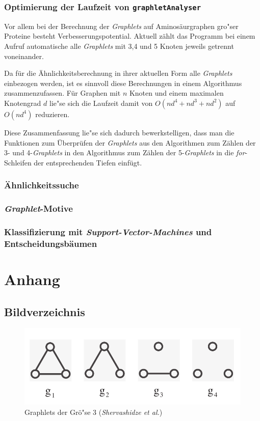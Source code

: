\documentclass{report}
\begin{document}
\subsection{Optimierung der Laufzeit von \texttt{graphletAnalyser}}

Vor allem bei der Berechnung der \textit{Graphlets} auf Aminos\"aurgraphen gro"ser Proteine besteht Verbesserungspotential. Aktuell z\"ahlt das Programm bei einem Aufruf automatische alle \textit{Graphlets} mit 3,4 und 5 Knoten jeweils getrennt voneinander.

Da f\"ur die \"Ahnlichkeitsberechnung in ihrer aktuellen Form alle \textit{Graphlets} einbezogen werden, ist es sinnvoll diese Berechnungen in einem Algorithmus zusammenzufassen. F\"ur Graphen mit $n$ Knoten und einem maximalen Knotengrad $d$ lie"se sich die Laufzeit damit von $O(nd^4+nd^3+nd^2)$ auf $O(nd^4)$ reduzieren.

Diese Zusammenfassung lie"se sich dadurch bewerkstelligen, dass man die Funktionen zum \"Uberpr\"ufen der \textit{Graphlets} aus den Algorithmen zum Z\"ahlen der 3- und 4-\textit{Graphlets} in den Algorithmus zum Z\"ahlen der 5-\textit{Graphlets} in die \textit{for}-Schleifen der entsprechenden Tiefen einf\"ugt.

\subsection{\"Ahnlichkeitssuche}

\subsection{\textit{Graphlet}-Motive}

\subsection{Klassifizierung mit \textit{Support-Vector-Machines} und Entscheidungsb\"aumen}




\chapter{Anhang}


\section{Bildverzeichnis}

\begin{figure}[h!]
\includegraphics[width =\linewidth]{3graphlets.pdf}
\caption{Graphlets der Gr\"o"se 3 (\textit{Shervashidze et al.})}
\label{fig:3graphlets}
\end{figure}
\end{document}
